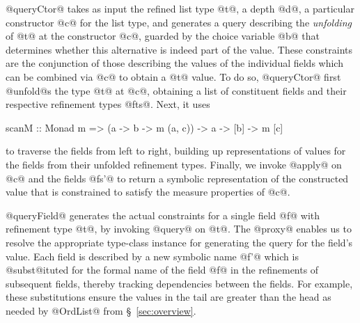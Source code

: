 @queryCtor@ takes as input the refined list type @t@, 
a depth @d@, a particular constructor @c@ for the list 
type, and generates a query describing the \emph{unfolding}
of @t@ at the constructor @c@, guarded by the choice 
variable @b@ that determines whether this alternative 
is indeed part of the value.
%
These constraints are the conjunction of
those describing the values of the individual fields 
which can be combined via @c@ to obtain a @t@ value.
%
To do so, @queryCtor@ first @unfold@s the type @t@ at 
@c@, obtaining a list of constituent fields and their
respective refinement types @fts@. Next, it uses 
%
\begin{code}
  scanM :: Monad m => (a -> b -> m (a, c)) -> a -> [b] -> m [c]
\end{code}
%
to traverse the fields from left to right, building up 
representations of values for the fields from their 
unfolded refinement types.
%
Finally, we invoke @apply@ on @c@ and the fields @fs'@ to 
return a symbolic representation of the constructed value 
that is constrained to satisfy the measure properties of @c@.

@queryField@ generates the actual constraints for a
single field @f@ with refinement type @t@, by invoking
@query@ on @t@.  
%
The @proxy@ enables us to resolve the appropriate 
type-class instance for generating the query for 
the field's value.
%
Each field is described by a new symbolic name @f'@ which is 
@subst@ituted for the formal name of the field @f@ in the
refinements of subsequent fields, thereby tracking dependencies
between the fields.
%
For example, these substitutions ensure the values in 
the tail are greater than the head as needed by 
@OrdList@ from \S~\ref{sec:overview}.

